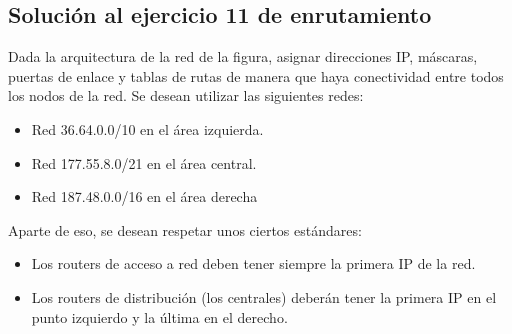 \documentclass[letterpaper,10pt,spanish]{sphinxmanual}
\begin{document}
\subsection{Solución al ejercicio 11 de enrutamiento}
\label{\detokenize{t2_integracion_elementos/ejercicios_subredes_ipv4/ejercicios_dos_router:solucion-al-ejercicio-11-de-enrutamiento}}
\sphinxAtStartPar
Dada la arquitectura de la red de la figura, asignar direcciones IP, máscaras, puertas de enlace y tablas de rutas de manera que haya conectividad entre todos
los nodos de la red. Se desean utilizar las siguientes redes:
\begin{itemize}
\item {} 
\sphinxAtStartPar
Red 36.64.0.0/10 en el área izquierda.

\item {} 
\sphinxAtStartPar
Red 177.55.8.0/21 en el área central.

\item {} 
\sphinxAtStartPar
Red 187.48.0.0/16 en el área derecha

\end{itemize}

\begin{figure}[htbp]
\centering

\noindent{}
\end{figure}

\sphinxAtStartPar
Aparte de eso, se desean respetar unos ciertos estándares:
\begin{itemize}
\item {} 
\sphinxAtStartPar
Los routers de acceso a red deben tener siempre la primera IP de la red.

\item {} 
\sphinxAtStartPar
Los routers de distribución (los centrales) deberán tener la primera IP en el punto izquierdo y la última en el derecho.

\end{itemize}
\end{document}
